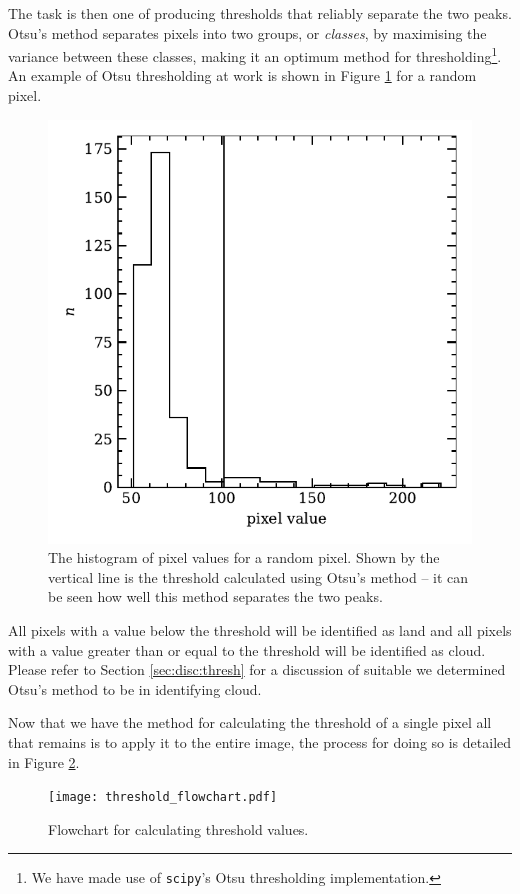 The task is then one of producing thresholds that reliably separate the two
peaks. Otsu's method \citep{gonzalez2008} separates pixels into two groups, or
\emph{classes}, by maximising the variance between these classes, making it an
optimum method for thresholding\footnote{We have made use of \texttt{scipy}'s
  Otsu thresholding implementation.}. An example of Otsu thresholding at work is
shown in Figure \ref{fig:otsu} for a random pixel.
\begin{figure}
  \centering
    \includegraphics[width=0.8\linewidth]{figures/otsu_bimodal.pdf}
    \caption{The histogram of pixel values for a random pixel. Shown by the
      vertical line is the threshold calculated using Otsu's method -- it can be
      seen how well this method separates the two peaks.}
    \label{fig:otsu}
\end{figure}
All pixels with a value below the threshold will be identified as land and all
pixels with a value greater than or equal to the threshold will be identified as
cloud. Please refer to Section \ref{sec:disc:thresh} for a discussion of
suitable we determined Otsu's method to be in identifying cloud.

Now that we have the method for calculating the threshold of a single
pixel all that remains is to apply it to the entire image, the process for doing
so is detailed in Figure \ref{fig:thr_fc}.
\begin{figure}[t!]
  \centering
  \texttt{[image: threshold\_flowchart.pdf]}
  \caption{Flowchart for calculating threshold values.}
  \label{fig:thr_fc}
\end{figure}

